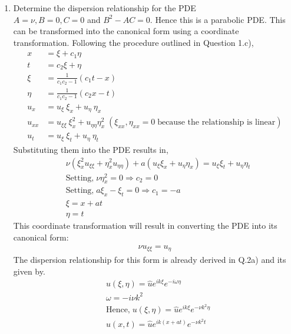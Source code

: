 \documentclass[11pt]{article}
\begin{document}
\begin{enumerate}
\begin{enumerate}[label = (\alph*)]
\item{\color{blue} Determine the dispersion relationship for the PDE}\\
$A = \nu, B = 0, C = 0$ and $B^2 - AC = 0$. Hence this is a parabolic PDE. This can be transformed into the canonical form using a coordinate transformation.  Following the procedure outlined in Question 1.c), 
\begin{align*}
x & = \xi + c_1\eta \\
t & = c_2\xi + \eta \\
\xi & = \frac{1}{c_1c_2 - 1}(c_1t - x) \\
\eta & = \frac{1}{c_1c_2 - 1}(c_2x - t)\\
u_x & = u_\xi \ \xi_x + u_\eta \ \eta_x \\
u_{xx} & = u_{\xi\xi} \ \xi^2_x + u_{\eta\eta} \eta^2_x \; (\xi_{xx}, \eta_{xx} = 0 \; \text{because the relationship is linear})\\
u_t &= u_\xi \ \xi_t + u_\eta \ \eta_t 
\end{align*}
Substituting them into the PDE results in,
\begin{align*}
& \nu(\xi^2_x u_{\xi\xi} + \eta^2_x u_{\eta\eta}) + a(u_\xi \xi_x + u_\eta \eta_x) = u_\xi \xi_t + u_\eta \eta_t \\
& \text{Setting,} \; \nu \eta^2_x = 0 \Rightarrow c_2 = 0 \\
& \text{Setting,}\; a\xi_x -\xi_t = 0 \Rightarrow c_1 = -a \\
& \xi = x + at \\
& \eta = t 
\end{align*}
This coordinate transformation will result in converting the PDE into its canonical form:
\begin{align*}
\nu u_{\xi\xi} = u_\eta
\end{align*}
The dispersion relationship for this form is already derived in Q.2a) and its given by.
\begin{align*}
& u(\xi,\eta) = \hat{u}e^{ik\xi}e^{-i\omega \eta}\\
& \omega = -i\nu k^2 \\
& \text{Hence,} \; u(\xi,\eta) = \hat{u} e^{ik\xi}e^{-\nu k^2\eta} \\
& u(x,t) = \hat{u} e^{ik(x+at)}e^{-\nu k^2t}
\end{align*}


\end{enumerate}
\end{enumerate}
\end{document}

